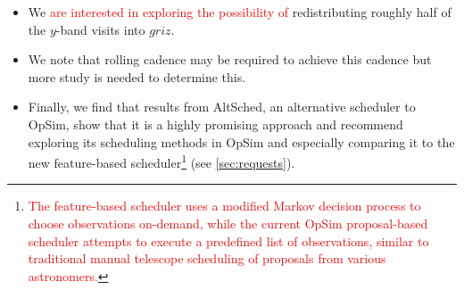 \documentclass[12pt, letterpaper]{article}
\newcommand{\review}[1]{{\textcolor{red}{#1}}}
\begin{document}
\begin{itemize}
\item We \review{are interested in exploring the possibility of} redistributing roughly half of the $y$-band visits into $griz$. 
\item We note that rolling cadence may be required to achieve this cadence but more study is needed to determine this. 
\item Finally, we find that results from AltSched, an alternative scheduler to OpSim, show that it is a highly promising approach and recommend exploring its scheduling methods in OpSim and especially comparing it to the new feature-based scheduler\footnote{\review{The feature-based scheduler \cite{feature2018} uses a modified Markov decision process to choose observations on-demand, while the current OpSim proposal-based scheduler \cite{opsim2014} attempts to execute a predefined list of observations, similar to traditional manual telescope scheduling of proposals from various astronomers.}} (see \autoref{sec:requests}).
\end{itemize}

\vspace{.3in}
\end{document}
